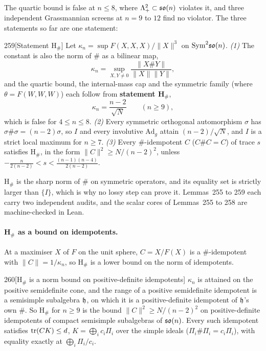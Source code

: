 The quartic bound is false at $n\le8$, where $\Lambda^2_+\subset\mathfrak{so}(n)$ violates it, and three independent Grassmannian screens at $n=9$ to $12$ find no violator. The three statements so far are one statement:

\begin{Lem}{259}[Statement H$_\#$]
Let $\kappa_n=\sup F(X,X,X)/\lVert X\rVert^3$ on $\mathrm{Sym}^2\mathfrak{so}(n)$. \emph{(1)} The constant is also the norm of $\#$ as a bilinear map,
\[
\kappa_n=\sup_{X,Y\ne0}\frac{\lVert X\#Y\rVert}{\lVert X\rVert\lVert Y\rVert},
\]
and the quartic bound, the internal-mass cap and the symmetric family (where $\theta=F(W,W,W)$) each follow from \textbf{statement H$_\#$},
\[
\kappa_n=\frac{n-2}{\sqrt N}\qquad(n\ge9),
\]
which is false for $4\le n\le8$. \emph{(2)} Every symmetric orthogonal automorphism $\sigma$ has $\sigma\#\sigma=(n-2)\sigma$, so $I$ and every involutive $\mathrm{Ad}_g$ attain $(n-2)/\sqrt N$, and $I$ is a strict local maximum for $n\ge7$. \emph{(3)} Every $\#$-idempotent $C$ ($C\#C=C$) of trace $s$ satisfies H$_\#$, in the form $\lVert C\rVert^2\ge N/(n-2)^2$, unless $-\tfrac n{2(n-2)}<s<\tfrac{(n-1)(n-4)}{2(n-2)}$.
\end{Lem}

H$_\#$ is the sharp norm of $\#$ on symmetric operators, and its equality set is strictly larger than $\{I\}$, which is why no lossy step can prove it. Lemmas~255 to 259 each carry two independent audits, and the scalar cores of Lemmas~255 to 258 are machine-checked in Lean.

\paragraph{H$_\#$ as a bound on idempotents.} At a maximiser $X$ of $F$ on the unit sphere, $C=X/F(X)$ is a $\#$-idempotent with $\lVert C\rVert=1/\kappa_n$, so H$_\#$ is a lower bound on the norm of idempotents.

\begin{Lem}{260}[H$_\#$ is a norm bound on positive-definite idempotents]
$\kappa_n$ is attained on the positive semidefinite cone, and the range of a positive semidefinite idempotent is a semisimple subalgebra $\mathfrak{h}$, on which it is a positive-definite idempotent of $\mathfrak{h}$'s own $\#$. So H$_\#$ for $n\ge9$ is the bound $\lVert C\rVert^2\ge N/(n-2)^2$ on positive-definite idempotents of compact semisimple subalgebras of $\mathfrak{so}(n)$. Every such idempotent satisfies $\operatorname{tr}(CK)\le d$, $K=\bigoplus_ic_i\Pi_i$ over the simple ideals ($\Pi_i\#\Pi_i=c_i\Pi_i$), with equality exactly at $\bigoplus_i\Pi_i/c_i$.
\end{Lem}

